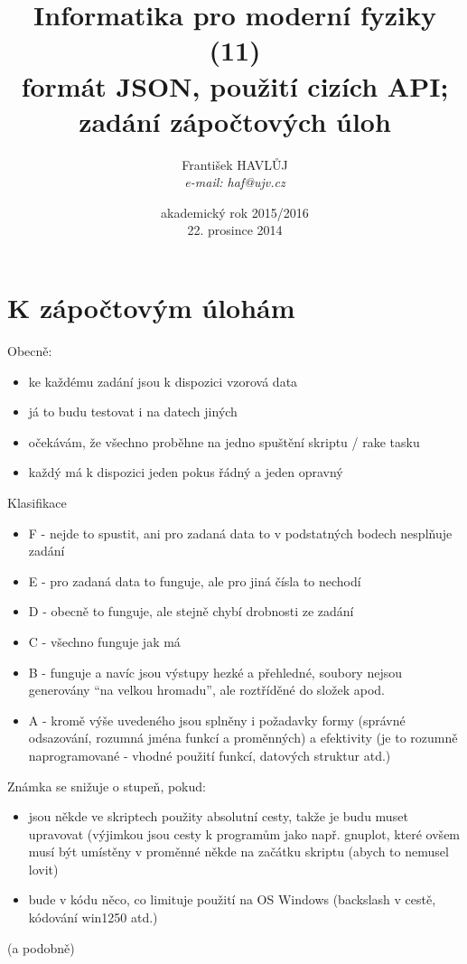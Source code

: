\documentclass{beamer}
\title[IMF (11)]{Informatika pro moderní fyziky (11)\\ formát JSON, použití cizích API; zadání zápočtových úloh}
\author[Franti\v{s}ek HAVL\r{U}J, ORF ÚJV Řež]{Franti\v{s}ek HAVL\r{U}J\\{\scriptsize \emph{e-mail: haf@ujv.cz}}}
\date{akademický rok 2015/2016\\22. prosince 2014}
\institute[ORF ÚJV Řež]
{ÚJV Řež\\oddělení Reaktorové fyziky a podpory palivového cyklu}
\begin{document}
\begin{frame}
  \titlepage
\end{frame}

\begin{frame}
  \tableofcontents
\end{frame}

\section{K zápočtovým úlohám}

\begin{frame}{Obecně:}
\begin{itemize}
  \item ke každému zadání jsou k dispozici vzorová data
  \item já to budu testovat i na datech jiných
  \item očekávám, že všechno proběhne na jedno spuštění skriptu / rake tasku
  \item každý má k dispozici jeden pokus řádný a jeden opravný
\end{itemize}
\end{frame}

\begin{frame}{Klasifikace}
  \begin{itemize}
    \item F - nejde to spustit, ani pro zadaná data to v podstatných bodech nesplňuje zadání
    \item E - pro zadaná data to funguje, ale pro jiná čísla to nechodí
    \item D - obecně to funguje, ale stejně chybí drobnosti ze zadání
    \item C - všechno funguje jak má
    \item B - funguje a navíc jsou výstupy hezké a přehledné, soubory nejsou generovány “na velkou hromadu”, ale roztříděné do složek apod.
    \item A - kromě výše uvedeného jsou splněny i požadavky formy (správné odsazování, rozumná jména funkcí a proměnných) a efektivity (je to rozumně naprogramované - vhodné použití funkcí, datových struktur atd.)
  \end{itemize}
\end{frame}

\begin{frame}{Známka se snižuje o stupeň, pokud:}
  \begin{itemize}
    \item jsou někde ve skriptech použity absolutní cesty, takže je budu muset upravovat (výjimkou jsou cesty k programům jako např. gnuplot, které ovšem musí být umístěny v proměnné někde na začátku skriptu (abych to nemusel lovit)
    \item bude v kódu něco, co limituje použití na OS Windows (backslash v cestě, kódování win1250 atd.)
  \end{itemize}
  (a podobně)
\end{frame}
\end{document}
